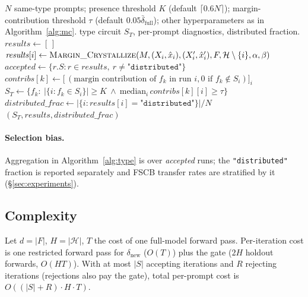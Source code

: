 \documentclass[10pt]{article}
\begin{document}
\begin{algorithm}[t]
\caption{\textsc{Fingerprint\_Type}$(M, \{(X_i, \hat x_i, X'_i, \hat x'_i)\}_{i=1}^N, F, \mathcal{H}, \alpha, \beta, K, \tau)$}
\label{alg:type}
\begin{algorithmic}[1]
\Require $N$ same-type prompts; presence threshold $K$ (default $\lceil 0.6 N\rceil$); margin-contribution threshold $\tau$ (default $0.05\bar\delta_{\text{full}}$); other hyperparameters as in Algorithm~\ref{alg:mc}.
\Ensure type circuit $S_T$, per-prompt diagnostics, distributed fraction.
\State $\mathit{results} \gets [\,]$
  \State $\mathit{results}[i] \gets \textsc{Margin\_Crystallize}(M, (X_i, \hat x_i), (X'_i, \hat x'_i), F, \mathcal{H} \setminus \{i\}, \alpha, \beta)$
\EndFor
\State $\mathit{accepted} \gets \{r.S : r \in \mathit{results},\ r \neq \texttt{"distributed"}\}$
\State $\mathit{contribs}[k] \gets \big[\,(\text{margin contribution of } f_k \text{ in run } i, 0 \text{ if } f_k \notin S_i)\big]_i$
\State $S_T \gets \big\{ f_k :\ |\{i : f_k \in S_i\}| \geq K\ \wedge\ \mathrm{median}_i\,\mathit{contribs}[k][i] \geq \tau \big\}$
\State $\mathit{distributed\_frac} \gets |\{i : \mathit{results}[i] = \texttt{"distributed"}\}| / N$
\State \Return $(S_T, \mathit{results}, \mathit{distributed\_frac})$
\end{algorithmic}
\end{algorithm}

\paragraph{Selection bias.} Aggregation in Algorithm~\ref{alg:type} is over \emph{accepted} runs; the \texttt{"distributed"} fraction is reported separately and FSCB transfer rates are stratified by it (\S\ref{sec:experiments}).

\subsection{Complexity}

Let $d = |F|$, $H = |\mathcal{H}|$, $T$ the cost of one full-model forward pass. Per-iteration cost is one restricted forward pass for $\delta_{\text{new}}$ ($O(T)$) plus the gate ($2H$ holdout forwards, $O(HT)$). With at most $|S|$ accepting iterations and $R$ rejecting iterations (rejections also pay the gate), total per-prompt cost is $O((|S| + R) \cdot H \cdot T)$.
\end{document}
